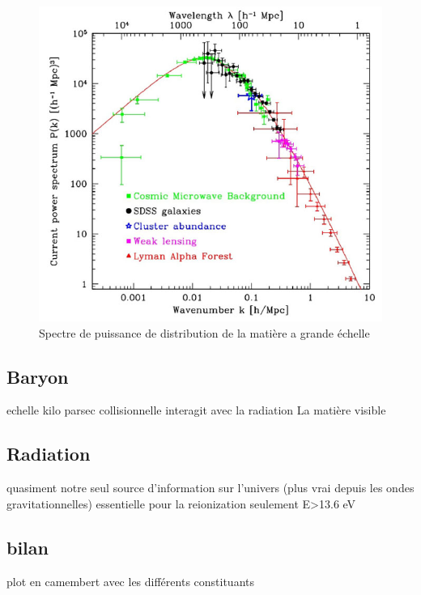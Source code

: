 \begin{figure}[bth]
        \includegraphics[width=.95\linewidth]{img/01/matter_power_spectrum.jpeg} 
        \caption{Spectre de puissance de distribution de la matière a grande échelle
        }
 		\label{fig:matter_power_spectrum}
\end{figure}



\subsection{Baryon}

echelle kilo parsec
collisionnelle
interagit avec la radiation
La matière visible

\subsection{Radiation}

quasiment notre seul source d'information sur l'univers (plus vrai depuis les ondes gravitationnelles)
essentielle pour la reionization
seulement E>13.6 eV

\subsection{bilan}

plot en camembert avec les différents constituants


